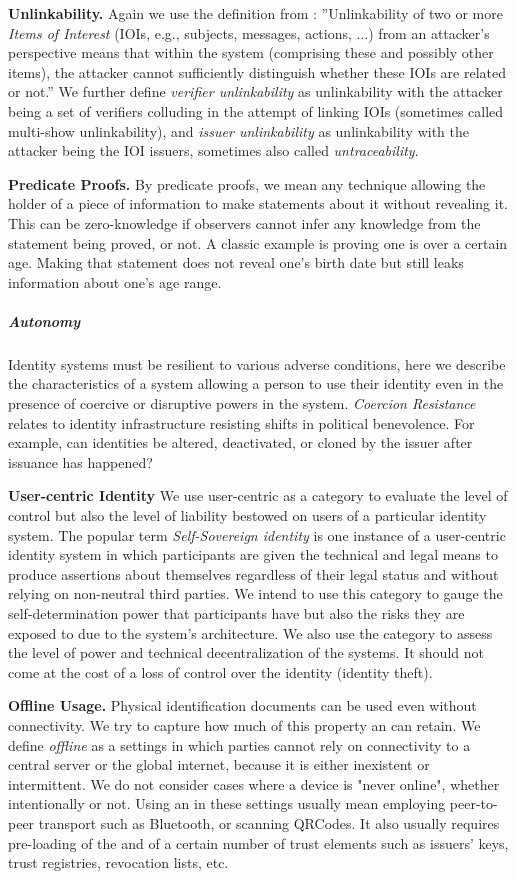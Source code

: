 \textbf{Unlinkability.} Again we use the definition from \cite{ph10}: ''Unlinkability of two or more \emph{Items of Interest} (IOIs, e.g., subjects, messages, actions, ...)
from an attacker’s perspective means that within the system (comprising these and
possibly other items), the attacker cannot sufficiently distinguish whether these IOIs are
related or not.''
We further define \emph{verifier unlinkability} as unlinkability with the attacker being a set of verifiers colluding in the attempt of linking IOIs (sometimes called multi-show unlinkability), and \emph{issuer unlinkability} as unlinkability with the attacker being the IOI issuers, sometimes also called \emph{untraceability}.


\textbf{Predicate Proofs.} By predicate proofs, we mean any technique allowing the holder of a piece of information to make statements about it without revealing it. This can be zero-knowledge if observers cannot infer any knowledge from the statement being proved, or not. A classic example is proving one is over a certain age. Making that statement does not reveal one's birth date but still leaks information about one's age range.


\subparagraph{Autonomy} Identity systems must be resilient to various adverse conditions, here we describe the characteristics of a system allowing a person to use their identity even in the presence of coercive or disruptive powers in the system. \emph{Coercion Resistance} relates to identity infrastructure resisting shifts in political benevolence. For example, can identities be altered, deactivated, or cloned by the issuer after issuance has happened?


\textbf{User-centric Identity} We use user-centric as a category to evaluate the level of control but also the level of liability bestowed on users of a particular identity system. The popular term \emph{Self-Sovereign identity} is one instance of a user-centric identity system in which participants are given the technical and legal means to produce assertions about themselves regardless of their legal status and without relying on non-neutral third parties. We intend to use this category to gauge the self-determination power that participants have but also the risks they are exposed to due to the system's architecture. We also use the category to assess the level of power and technical decentralization of the systems. It should not come at the cost of a loss of control over the identity (identity theft).

\textbf{Offline Usage.} Physical identification documents can be used even without connectivity. We try to capture how much of this property an \eid can retain. We define \emph{offline} as a settings in which parties cannot rely on connectivity to a central server or the global internet, because it is either inexistent or intermittent. We do not consider cases where a device is "never online", whether intentionally or not. Using an \eid in these settings usually mean employing peer-to-peer transport such as Bluetooth, or scanning QRCodes. It also usually requires pre-loading of the \eid and of a certain number of trust elements such as issuers' keys, trust registries, revocation lists, etc.

